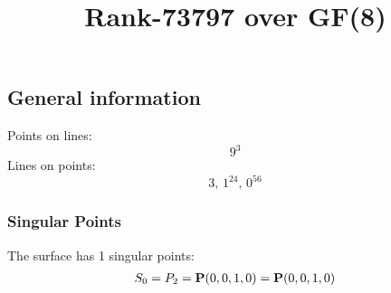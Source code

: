 \documentclass{article}
\newcommand\setTBstruts{\def\T{\rule{0pt}{2.6ex}}%
\def\B{\rule[-1.2ex]{0pt}{0pt}}}
\newcommand{\bP}{{\bf P}}
\begin{document}
 
\setTBstruts



{\allowdisplaybreaks%






\title{Rank-73797 over GF(8)}
\author{}%
\maketitle%
%
{}



\subsection*{General information}
Points on lines:
$$
9^3$$
Lines on points:
$$
3,\,1^{24},\,0^{56}$$
\subsubsection*{Singular Points}
The surface has 1 singular points:\\
\begin{align*}
S_{0} &= P_{2}=\bP(0, 0, 1, 0) = \bP(0, 0, 1, 0)\\
\end{align*}
}
\end{document}
